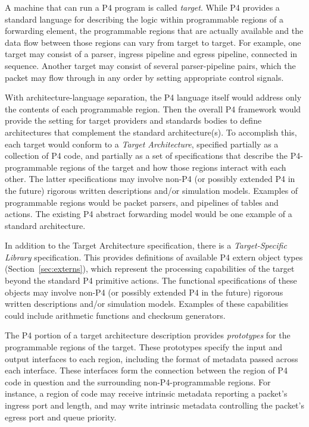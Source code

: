 \documentclass[12pt]{article}
\begin{document}
A machine that can run a P4 program is called \textit{target}.
While P4 provides a standard language for describing the logic within
programmable regions of a forwarding element, the programmable regions that are
actually available and the data flow between those regions can vary
from target to target.  For example, one target may consist of a parser,
ingress \matchaction pipeline and egress \matchaction pipeline, connected in
sequence.  Another target may consist of several parser-pipeline pairs,
which the packet may flow through in any order by setting appropriate
control signals.

With architecture-language separation, the P4 language itself would address
only the contents of each programmable region.  Then the overall P4 framework
would provide the setting for target providers and standards bodies to
define architectures that complement the standard architecture(s).  To
accomplish this, each target would conform to a
\textit{Target Architecture}, specified partially as a collection of
P4 code, and partially as a set of specifications that describe the
P4-programmable regions of the target and how those regions interact with
each other.  The latter specifications may involve non-P4 (or possibly
extended P4 in the future) rigorous written descriptions and/or simulation
models.  Examples of programmable regions would be packet parsers, and
pipelines of tables and actions.  The existing P4 abstract forwarding model
would be one example of a standard architecture.

In addition to the Target Architecture specification, there is a
\textit{Target-Specific Library} specification.  This provides definitions
of available P4 extern object types (Section~\ref{sec:externs}), which
represent the processing capabilities of the target beyond the standard P4
primitive actions.  The functional specifications of these objects may involve
non-P4 (or possibly extended P4 in the future) rigorous written descriptions
and/or simulation models.  Examples of these capabilities could include
arithmetic functions and checksum generators.


The P4 portion of a target architecture description provides
\textit{prototypes} for the programmable regions of the target. These
prototypes specify the input and output interfaces to each region, including
the format of metadata passed across each interface.  These interfaces form
the connection between the region of P4 code in question and the surrounding
non-P4-programmable regions.  For instance, a region of code may receive
intrinsic metadata reporting a packet's ingress port and length, and may write
intrinsic metadata controlling the packet's egress port and queue priority.
\end{document}
